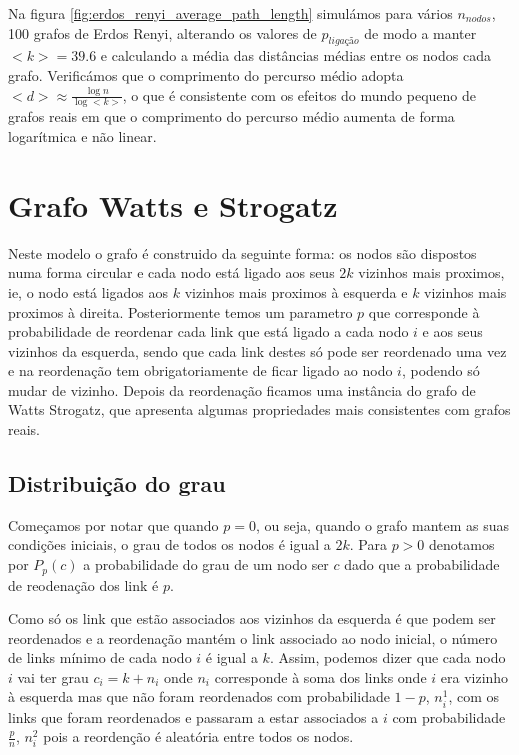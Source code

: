 \documentclass[conference, twocolumn]{IEEEtran}
\theoremstyle{plain}
\theoremstyle{definition}
\theoremstyle{remark}
\begin{document}
Na figura \ref{fig:erdos_renyi_average_path_length} simulámos para vários $n_{nodos}$, 100 grafos de Erdos Renyi, alterando os valores de $p_{ligação}$ de modo a manter $<k> = 39.6$ e calculando a média das distâncias médias entre os nodos cada grafo. Verificámos que o comprimento do percurso médio adopta $<d> \approx \frac{\log n}{\log <k>}$, o que é consistente com os efeitos do mundo pequeno de grafos reais em que o comprimento do percurso médio aumenta de forma logarítmica e não linear.

\section{ Grafo Watts e Strogatz}
Neste modelo o grafo é construido da seguinte forma: os nodos são dispostos numa forma circular e cada nodo está ligado aos seus $2k$ vizinhos mais proximos, ie, o nodo está ligados aos $k$ vizinhos mais proximos à esquerda e $k$ vizinhos mais proximos à direita.
Posteriormente temos um parametro $p$ que corresponde à probabilidade de reordenar cada link que está ligado a cada nodo $i$ e aos seus vizinhos da esquerda, sendo que cada link destes só pode ser reordenado uma vez e na reordenação tem obrigatoriamente de ficar ligado ao nodo $i$, podendo só mudar de vizinho.
Depois da reordenação ficamos uma instância do grafo de Watts Strogatz\cite{2}, que apresenta algumas propriedades mais consistentes com grafos reais.

\subsection{Distribuição do grau}
Começamos por notar que quando $p=0$, ou seja, quando o grafo mantem as suas condições iniciais, o grau de todos os nodos é igual a $2k$. Para $p>0$ denotamos por $P_{p}(c)$ a probabilidade do grau de um nodo ser $c$ dado que a probabilidade de reodenação dos link é $p$.

Como só os link que estão associados aos vizinhos da esquerda é que podem ser reordenados e a reordenação mantém o link associado ao nodo inicial, o número de links mínimo de cada nodo $i$ é igual a $k$. Assim, podemos dizer que cada nodo $i$ vai ter grau $c_{i}=k+n_{i}$ onde $n_{i}$ corresponde à soma dos links onde $i$ era vizinho à esquerda mas que não foram reordenados com probabilidade $1-p$, $n_{i}^{1}$, com os links que foram reordenados e passaram a estar associados a $i$ com probabilidade $\frac{p}{n}$, $n_{i}^{2}$ pois a reordenção é aleatória entre todos os nodos.\\
\end{document}
